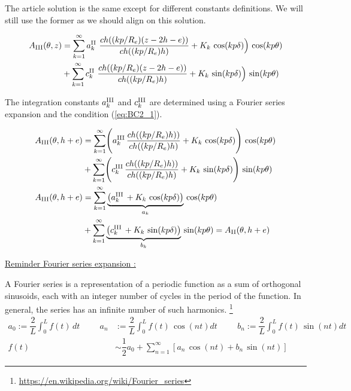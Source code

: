The article solution is the same except for different constants definitions. We will still use the former as we should align on this solution.

\begin{align*}
A_{\rm III} (\theta, z) 
&= \sum\limits_{k=1}^{\infty} a_k^{\rm II}\ \dfrac{ch((kp/R_e)(z-2h-e))}{ch((kp/R_e)h)}
+ K_k\, \cos(kp\delta) \Bigr)\, \cos(kp\theta) \\
&+ \sum\limits_{k=1}^{\infty} c_k^{\rm II}\ \dfrac{ch((kp/R_e)(z-2h-e))}{ch((kp/R_e)h)}
+ K_k\, \sin(kp\delta) \Bigr)\, \sin(kp\theta)
\end{align*}

The integration constants $a_k^{\rm III}$ and $c_k^{\rm III}$ are determined using a Fourier series expansion and the condition (\ref{eq:BC2_1}).

\begin{align*}
A_{\rm III}(\theta, h+e) &= 
\sum\limits_{k=1}^{\infty} \Biggr( 
a_k^{\rm III}\, \dfrac{ch((kp/R_e)h))}{ch((kp/R_e)h)}
+ K_k\, \cos(kp\delta) \Biggr)\, \cos(kp\theta) \\
&+ \sum\limits_{k=1}^{\infty} \Biggr( 
c_k^{\rm III}\, \dfrac{ch((kp/R_e)h))}{ch((kp/R_e)h)} 
+ K_k\, \sin(kp\delta) \Biggr)\, \sin(kp\theta) \\
A_{\rm III}(\theta, h+e) &= \sum\limits_{k=1}^{\infty} \underbrace{\left( a_k^{\rm III}\,+ K_k\, \cos(kp\delta) \right)}_{a_k}\, \cos(kp\theta) \\
&+ \sum\limits_{k=1}^{\infty}\underbrace{ \left( c_k^{\rm III}\,+ K_k\, \sin(kp\delta) \right)}_{b_k}\, \sin(kp\theta) = A_{\rm II}(\theta, h+e) 
\end{align*}

\underline{Reminder Fourier series expansion :}

A Fourier series is a representation of a periodic function as a sum of orthogonal sinusoids, each with an integer number of cycles in the period of the function. In general, the series has an infinite number of such harmonics. 
\footnote{\url{https://en.wikipedia.org/wiki/Fourier_series}}
\begin{align*}
a_0 := \dfrac{2}{L} \int_{0}^{L} f(t)\, dt \hspace{1cm}
a_n &:= \dfrac{2}{L} \int_{0}^{L} f(t)\, \cos(nt) dt \hspace{1cm}
b_n := \dfrac{2}{L} \int_{0}^{L} f(t)\, \sin(nt) dt \\
f(t) &\sim \dfrac{1}{2}a_0+\sum\limits_{n=1}^{\infty} \left[ a_n\, \cos(nt) + b_n\, \sin(nt) \right]
\end{align*}

